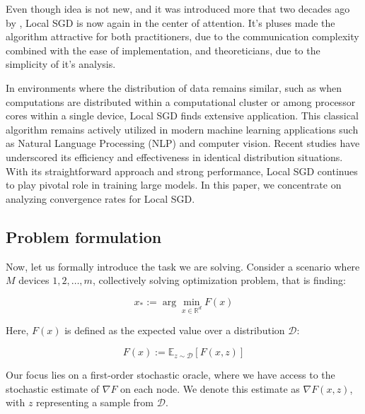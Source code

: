 \vspace{10pt}

Even though idea is not new, and it was introduced more that two decades ago by \cite{Mangasarian}, Local SGD is now again in the center of attention.
It's pluses made the algorithm attractive for both practitioners, due to the communication complexity combined with the ease of implementation, and theoreticians, due to the simplicity of it's analysis. 

\vspace{10pt}

In environments where the distribution of data remains similar, such as when computations are distributed within a computational cluster or among processor cores within a single device, Local SGD finds extensive application. This classical algorithm remains actively utilized in modern machine learning applications such as Natural Language Processing (NLP) and computer vision. Recent studies \citep{LocalSGD_LLM, LocalSGD_CV} have underscored its efficiency and effectiveness in identical distribution situations. With its straightforward approach and strong performance, Local SGD continues to play pivotal role in training large models. In this paper, we concentrate on analyzing convergence rates for Local SGD.

\vspace{10pt}

\subsection{Problem formulation} \label{subsec:problem_formulation}

Now, let us formally introduce the task we are solving. Consider a scenario where \( M \) devices \( 1, 2, \ldots, m \), collectively solving optimization problem, that is finding:

\[ x_* := \arg\min_{x \in \mathbb{R}^d} F(x) \]

Here, \( F(x) \) is defined as the expected value over a distribution \( \mathcal{D} \):

\[ F(x) := \mathbb{E}_{z \sim \mathcal{D}} [F(x, z)] \]


Our focus lies on a first-order stochastic oracle, where we have access to the stochastic estimate of \( \nabla F \) on each node. We denote this estimate as \( \nabla F(x, z) \), with \( z \) representing a sample from \( \mathcal{D} \).

